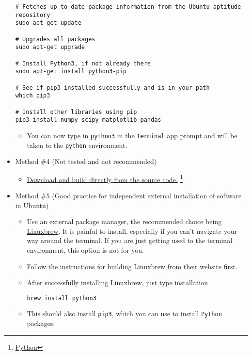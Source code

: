 \documentclass[11pt]{article}
\begin{document}
\begin{itemize}
\begin{verbatim}
# Fetches up-to-date package information from the Ubuntu aptitude repository
sudo apt-get update

# Upgrades all packages
sudo apt-get upgrade

# Install Python3, if not already there
sudo apt-get install python3-pip

# See if pip3 installed successfully and is in your path
which pip3

# Install other libraries using pip
pip3 install numpy scipy matplotlib pandas

\end{verbatim}
\begin{itemize}
\item You can now type in \texttt{python3} in the \texttt{Terminal} app prompt and will be taken
to the \texttt{python} environment.
\end{itemize}

\item Method \#4 (Not tested and not recommended)
\label{sec:org8f810f0}
\begin{itemize}
\item \href{https://www.python.org/downloads/source/}{Download and build directly from the source code.} \footnote{\href{https://www.python.org/}{Python}\label{org039ccfb}}
\end{itemize}
\item Method \#5 (Good practice for independent external installation of software in Ubuntu)
\label{sec:org8ed70ab}
\begin{itemize}
\item Use an external package manager, the recommended choice being \href{https://linuxbrew.sh/}{Linuxbrew}. It
is painful to install, especially if you can't navigate your way
around the terminal. If you are just getting used to the terminal
environment, this option is not for you.
\item Follow the instructions for building Linuxbrew from their website first.
\item After successfully installing Linuxbrew, just type installation
\begin{verbatim}
brew install python3
\end{verbatim}
\item This should also install \texttt{pip3}, which you can use to install \texttt{Python} packages.
\end{itemize}
\end{itemize}
\end{document}
